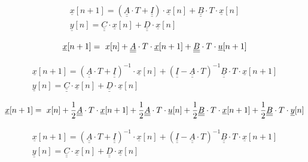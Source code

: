 \begin{equation}
\begin{align*}
\underline{x}[n + 1] = (\underline{\underline{A}} \cdot T + \underline{\underline{I}}) \cdot \underline{x}[n] + \underline{\underline{B}}\cdot{}T\cdot{}\underline{x}[n] \\[0.3em]

\underline{y}[n] = \underline{\underline{C}}\cdot \underline{x}[n] + \underline{\underline{D}}\cdot{}\underline{x}[n]
\end{align*} 
\end{equation}

\begin{equation}
\underline{x}[n + 1] = \ x[n] + \underline{\underline{A}} \cdot T \cdot \underline{x}[n + 1] + \underline{\underline{B}}\cdot{}T\cdot{}\underline{u}[n+1] \\[0.3em]
\end{equation}

\begin{equation}
\begin{align*}
\underline{x}[n + 1] = (\underline{\underline{A}} \cdot T + \underline{\underline{I}})^{-1} \cdot\underline{x}[n] + (\underline{\underline{I}} - \underline{\underline{A}} \cdot T)^{-1} \underline{\underline{B}}\cdot{}T\cdot{}\underline{x}[n + 1] \\[0.3em]

\underline{y}[n] = \underline{\underline{C}}\cdot \underline{x}[n] + \underline{\underline{D}}\cdot{}\underline{x}[n]
\end{align*} 
\end{equation}

\begin{equation}
\underline{x}[n + 1] = \ x[n] + \frac{1}{2}\underline{\underline{A}} \cdot T \cdot \underline{x}[n + 1] + \frac{1}{2}\underline{\underline{A}}\cdot{}T\cdot{}\underline{u}[n] + \frac{1}{2}\underline{\underline{B}} \cdot T \cdot \underline{x}[n + 1] + \frac{1}{2}\underline{\underline{B}}\cdot{}T\cdot{}\underline{y}[n] \\[0.3em]
\end{equation}

\begin{equation}
\begin{align*}
\underline{x}[n + 1] = (\underline{\underline{A}} \cdot T + \underline{\underline{I}})^{-1} \cdot\underline{x}[n] + (\underline{\underline{I}} - \underline{\underline{A}} \cdot T)^{-1} \underline{\underline{B}}\cdot{}T\cdot{}\underline{x}[n + 1] \\[0.3em]

\underline{y}[n] = \underline{\underline{C}}\cdot \underline{x}[n] + \underline{\underline{D}}\cdot{}\underline{x}[n]
\end{align*} 
\end{equation}

